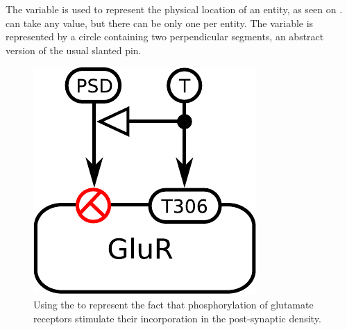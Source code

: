 The variable  is used to represent the physical location of an entity, as seen on \label{sec:location}.  can take any value, but there can be only one  per entity. The variable is represented by a circle containing two perpendicular segments, an abstract version of the usual slanted pin.

\begin{figure}[H]
  \centering
  \includegraphics[scale = 0.5]{examples/ex-location-2}
  \caption{Using the   to represent the fact that phosphorylation of glutamate receptors stimulate their incorporation in the post-synaptic density.}
  \label{fig:ex-location}
\end{figure}


